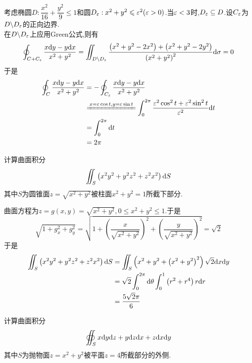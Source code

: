\documentclass{ctexart}
\begin{document}
\begin{solution}
    考虑椭圆$D:\dfrac{x^2}{16}+\dfrac{y^2}{9}\leqslant1$和圆$D_\varepsilon:x^2+y^2\leqslant\varepsilon^2(\varepsilon>0)$.当$\varepsilon<3$时,$D_\varepsilon\subseteq D$.设$C_\varepsilon$为$D\backslash D_\varepsilon$的正向边界.\\
    在$D\backslash D_\varepsilon$上应用Green公式,则有
    \[\oint_{C+C_\varepsilon}\dfrac{x\mathrm{d} y-y\mathrm{d} x}{x^2+y^2}
    =\iint_{D\backslash D_\varepsilon}\dfrac{\left(x^2+y^2-2x^2\right)+\left(x^2+y^2-2y^2\right)}{\left(x^2+y^2\right)^2}\mathrm{d}\sigma=0\]
    于是
    \[\begin{aligned}
        \oint_C\dfrac{x\di y-y\di x}{x^2+y^2}
        &= -\oint_{C_\ep}\dfrac{x\di y-y\di x}{x^2+y^2} \\
        &\xlongequal{x=\ep\cos t,y=\ep\sin t} \int_0^{2\pi}\dfrac{\ep^2\cos^2t+\ep^2\sin^2t}{\ep^2}\di t \\
        &= \int_0^{2\pi}\di t \\
        &= 2\pi
    \end{aligned}\]
\end{solution}
\begin{problem}[4.(10\songti{分})]
    计算曲面积分
    \[\iint_{S}\left(x^2y^2+y^2z^2+z^2x^2\right)\mathrm{d} S\]
    其中$S$为圆锥面$z=\sqrt{x^2+y^2}$被柱面$x^2+y^2=1$所截下部分.
\end{problem}
\begin{solution}
    曲面方程为$z=g(x,y)=\sqrt{x^2+y^2},0\leqslant x^2+y^2\leqslant 1$.于是
    \[\sqrt{1+g_x^2+g_y^2}=\sqrt{1+\left(\dfrac{x}{\sqrt{x^2+y^2}}\right)^2+\left(\dfrac{y}{\sqrt{x^2+y^2}}\right)^2}=\sqrt2\]
    于是
    \[\begin{aligned}
        \iint_{S}\left(x^2y^2+y^2z^2+z^2x^2\right)\mathrm{d} S
        &= \iint_{S}\left(x^2+y^2+\left(x^2+y^2\right)^2\right)\sqrt2\mathrm{d} x\mathrm{d} y \\
        &= \sqrt2\int_0^{2\pi}\mathrm{d}\theta\int_0^1\left(r^2+r^4\right)r\mathrm{d} r \\
        &= \dfrac{5\sqrt2\pi}{6}
    \end{aligned}\]
\end{solution}
\begin{problem}[5.(15\songti{分})]
    计算曲面积分
    \[\oiint_Sx\mathrm{d} y\mathrm{d} z+y\mathrm{d} z\mathrm{d} x+z\mathrm{d} x\mathrm{d} y\]
    其中$S$为抛物面$z=x^2+y^2$被平面$z=4$所截部分的外侧.
\end{problem}
\end{document}
